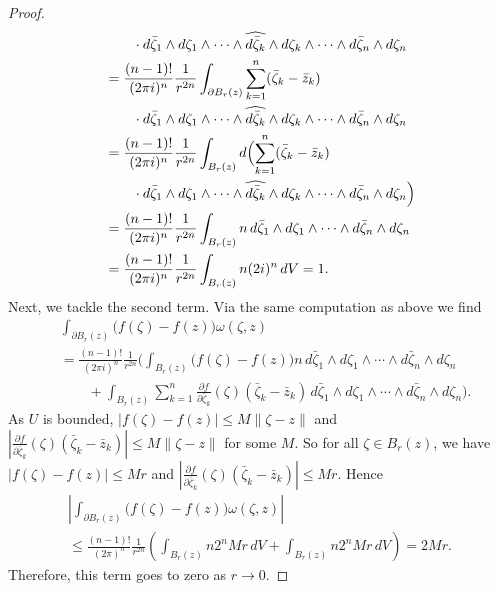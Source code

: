 \begin{proof}
\begin{align*}
&\qquad\cdot d\bar\zeta_1\wedge d\zeta_1\wedge\cdots\wedge\widehat{d\bar\zeta_k}\wedge d\zeta_k\wedge\cdots\wedge d\bar\zeta_n\wedge d\zeta_n\\
&=\frac{(n-1)!}{(2\pi i)^n}\frac1{r^{2n}}\int_{\partial B_r(z)}\sum_{k=1}^n(\bar\zeta_k-\bar z_k)\\
&\qquad\cdot d\bar\zeta_1\wedge d\zeta_1\wedge\cdots\wedge\widehat{d\bar\zeta_k}\wedge d\zeta_k\wedge\cdots\wedge d\bar\zeta_n\wedge d\zeta_n\\
&=\frac{(n-1)!}{(2\pi i)^n}\frac1{r^{2n}}\int_{B_r(z)}d\Bigl(\sum_{k=1}^n(\bar\zeta_k-\bar z_k)\\
&\qquad\cdot d\bar\zeta_1\wedge d\zeta_1\wedge\cdots\wedge\widehat{d\bar\zeta_k}\wedge d\zeta_k\wedge\cdots\wedge d\bar\zeta_n\wedge d\zeta_n\Bigr)\\
&=\frac{(n-1)!}{(2\pi i)^n}\frac1{r^{2n}}\int_{B_r(z)}n\,d\bar\zeta_1\wedge d\zeta_1\wedge\cdots\wedge d\bar\zeta_n\wedge d\zeta_n\\
&=\frac{(n-1)!}{(2\pi i)^n}\frac1{r^{2n}}\int_{B_r(z)}n(2i)^n\,dV=1.
\end{align*}
Next, we tackle the second term. Via the same computation as above we find
\begin{align*}
&\int_{\partial B_r(z)}\bigl(f(\zeta)-f(z)\bigr)\omega(\zeta,z)\\
&=\frac{(n-1)!}{(2\pi i)^n}\frac1{r^{2n}}\Biggl(\int_{B_r(z)}\bigl(f(\zeta)-f(z)\bigr)n\,d\bar\zeta_1\wedge d\zeta_1\wedge\cdots\wedge d\bar\zeta_n\wedge d\zeta_n\\
&\qquad+\int_{B_r(z)}\sum_{k=1}^n\frac{\partial f}{\partial\bar\zeta_k}(\zeta)(\bar\zeta_k-\bar z_k)\,d\bar\zeta_1\wedge d\zeta_1\wedge\cdots\wedge d\bar\zeta_n\wedge d\zeta_n\Biggr).
\end{align*}
As $U$ is bounded, $|f(\zeta)-f(z)|\leq M\|\zeta-z\|$ and $\left|\frac{\partial f}{\partial\bar\zeta_k}(\zeta)(\bar\zeta_k-\bar z_k)\right|\leq M\|\zeta-z\|$ for some $M$. So for all $\zeta\in B_r(z)$, we have $|f(\zeta)-f(z)|\leq Mr$ and $\left|\frac{\partial f}{\partial\bar\zeta_k}(\zeta)(\bar\zeta_k-\bar z_k)\right|\leq Mr$. Hence
\begin{multline*}
\left|\int_{\partial B_r(z)}\bigl(f(\zeta)-f(z)\bigr)\omega(\zeta,z)\right|\\
\leq\frac{(n-1)!}{(2\pi)^n}\frac1{r^{2n}}\left(\int_{B_r(z)}n2^nMr\,dV+\int_{B_r(z)}n2^nMr\,dV\right)=2Mr.
\end{multline*}
Therefore, this term goes to zero as $r\to0$.
\end{proof}
